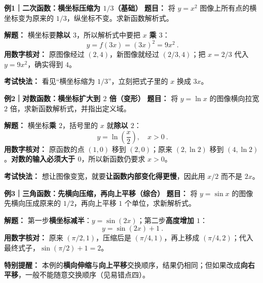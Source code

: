 \begin{examplebox}
  \textbf{\textcolor{CExample}{例1｜二次函数：横坐标压缩为 $1/3$（基础）}}
  \textbf{题目：} 将 $y=x^2$ 图像上所有点的横坐标变为原来的 $1/3$，纵坐标不变。求新函数解析式。

  \textbf{解题：} 横坐标要\textbf{除以 $3$}，所以解析式中要把 $x$ \textbf{乘 $3$}：
  \[
    \boxed{\ y=f(3x)=(3x)^2=9x^2\ }.
  \]
  \textbf{用数字核对：} 原图像经过 $(2,4)$，新图像就经过 $(2/3,4)$；把 $x=2/3$ 代入 $y=9x^2$，确实得到 $4$。
  \begin{center}
  
  \end{center}
  \textbf{考试快法：} 看见“横坐标缩为 $1/3$”，立刻把式子里的 $x$ 换成 $3x$。

  \medskip
  \textbf{\textcolor{CExample}{例2｜对数函数：横坐标扩大到 $2$ 倍（变形）}}
  \textbf{题目：} 将 $y=\ln x$ 的图像横向拉宽 $2$ 倍，求新函数解析式，并指出定义域。

  \textbf{解题：} 横坐标\textbf{乘 $2$}，括号里的 $x$ 就\textbf{除以 $2$}：
  \[
    \boxed{\ y=\ln\!\left(\frac{x}{2}\right),\quad x>0\ }.
  \]
  \textbf{用数字核对：} 原函数的点 $(1,0)$ 移到 $(2,0)$；原来 $(2,\ln 2)$ 移到 $(4,\ln2)$。\textbf{对数的输入必须大于 $0$}，所以新函数仍要求 $x>0$。
  \begin{center}
  
  \end{center}
  \textbf{考试快法：} 想让图像变宽，就要\textbf{让函数内部变化得更慢}，因此用 $x/2$ 而不是 $2x$。

  \medskip
  \textbf{\textcolor{CExample}{例3｜三角函数：先横向压缩，再向上平移（综合）}}
  \textbf{题目：} 将 $y=\sin x$ 的图像先横向压成原来的 $1/2$，再向上平移 $1$ 个单位，求新解析式。

  \textbf{解题：} 第一步\textbf{横坐标减半}：$y=\sin(2x)$；第二步\textbf{高度增加 $1$}：
  \[
     \boxed{\ y=\sin(2x)+1\ }.
  \]
  \textbf{用数字核对：} 原来 $(\pi/2,1)$，压缩后是 $(\pi/4,1)$，再上移成 $(\pi/4,2)$；代入最终式子，$\sin(\pi/2)+1=2$。
  \begin{center}
  
  \end{center}
  \textbf{特别提醒：} 本例的\textbf{横向伸缩}与\textbf{向上平移}交换顺序，结果仍相同；但如果改成\textbf{向右平移}，一般不能随意交换顺序（见易错点四）。
\end{examplebox}
